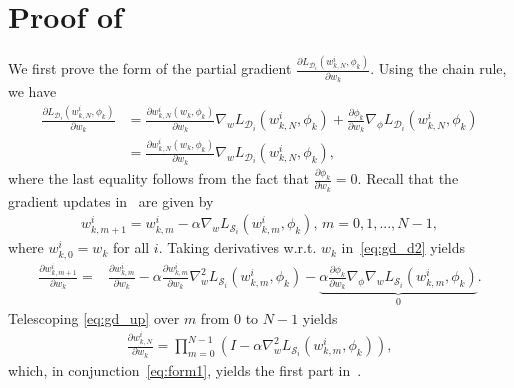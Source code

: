 \documentclass{osudissert96}
\begin{document}
\section{Proof of~ }
We first prove the form of the partial gradient $\frac{\partial L_{\mathcal{D}_i}( w^i_{k,N}, \phi_k)}{\partial w_k}$. Using the chain rule, we have 
\begin{align}\label{eq:form1}
\frac{\partial L_{\mathcal{D}_i}( w^i_{k,N}, \phi_k)}{\partial w_k} &= \frac{\partial w_{k,N}^i(w_k,\phi_k)}{\partial w_k} \nabla_{w} L_{\mathcal{D}_i} (w_{k,N}^i,\phi_k) + \frac{\partial \phi_k}{\partial w_k} \nabla_{\phi} L_{\mathcal{D}_i} (w_{k,N}^i,\phi_k) \nonumber
\\& = \frac{\partial w_{k,N}^i(w_k,\phi_k)}{\partial w_k} \nabla_{w} L_{\mathcal{D}_i} (w_{k,N}^i,\phi_k), 
\end{align}
where the last equality follows from the fact that $\frac{\partial \phi_k}{\partial w_k}  = 0$. Recall that the gradient updates in~ are given by 
\begin{align}\label{eq:gd_d2}
w_{k,m+1}^i = w_{k,m}^i - \alpha \nabla_{w} L_{\mathcal{S}_i} (w_{k,m}^i,\phi_k),\, m=0,1,...,N-1,
\end{align}
where $w_{k,0}^i=w_k $ for all $i$. 
Taking derivatives w.r.t. $w_k$ in~\cref{eq:gd_d2} yields
\begin{align}\label{eq:gd_up}
\frac{\partial w_{k,m+1}^i}{\partial w_k} = &\frac{\partial w_{k,m}^i}{\partial w_k} - \alpha \frac{\partial w_{k,m}^i}{\partial w_k}\nabla^2_{w} L_{\mathcal{S}_i}(w_{k,m}^i,\phi_k)-  \underbrace{\alpha \frac{\partial \phi_k}{\partial w_k}\nabla_\phi\nabla_{w} L_{\mathcal{S}_i}(w_{k,m}^i,\phi_k)}_{0}. 
\end{align}
Telescoping \cref{eq:gd_up} over $m$ from $0$ to $N-1$ yields
\begin{align*}
\frac{\partial w_{k,N}^i}{\partial w_k} = \prod_{m=0}^{N-1}(I - \alpha \nabla_w^2L_{\mathcal{S}_i}(w_{k,m}^i,\phi_k)),
\end{align*}
which, in conjunction~\cref{eq:form1}, yields the first part in~. 
\end{document}
